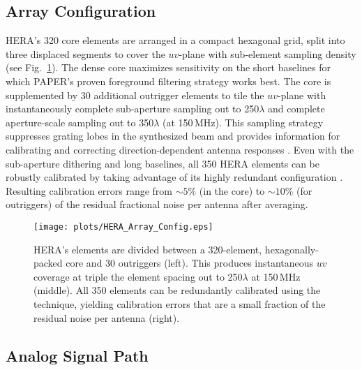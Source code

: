 \documentclass[preprint,11pt]{aastex}
\begin{document}
\vspace{-20pt}
\subsection{Array Configuration}
\label{sec:arrayConfig}
\vspace{-5pt}

\noindent HERA's 320 core elements are arranged in a compact hexagonal grid, split into three displaced segments 
to cover the $uv$-plane with sub-element sampling density (see Fig.~\ref{fig:arrayConfig}). The dense core maximizes 
sensitivity on the short baselines for which PAPER's proven foreground filtering strategy works best.
The core is supplemented by 30 additional outrigger elements 
to tile the $uv$-plane with instantaneously complete sub-aperture 
sampling out to 250$\lambda$ and complete aperture-scale sampling out to 350$\lambda$ (at 150\,MHz). This sampling 
strategy suppresses grating lobes in the synthesized beam and provides information for calibrating and correcting 
direction-dependent antenna responses \citep{dillon_parsons2016}.
Even with the sub-aperture dithering and long baselines, all 350 HERA elements can be robustly calibrated by taking advantage of 
its highly redundant configuration \citep{liu_et_al2010,zheng_et_al2014}. 
Resulting calibration errors range from $\sim5\%$ (in the core) to $\sim10\%$ (for outriggers)
of the residual fractional noise per antenna after averaging.

\begin{figure}[tbh]
	\centering
	\vspace{-5pt}
	\texttt{[image: plots/HERA\_Array\_Config.eps]}
	\vspace{-25pt}
	\caption{HERA's elements are divided between a 320-element, hexagonally-packed core and 30 outriggers (left). This produces instantaneous
$uv$ coverage at triple the element spacing out to 250$\lambda$ at 150\,MHz (middle). All 350 elements can be redundantly calibrated 
using the \citet{liu_et_al2010} technique, yielding calibration errors that are a small fraction of the residual noise per antenna (right).}
		\label{fig:arrayConfig}
			\vspace{-10pt}
\end{figure}

\vspace{-20pt}
\subsection{Analog Signal Path}
\vspace{-5pt}
\end{document}
